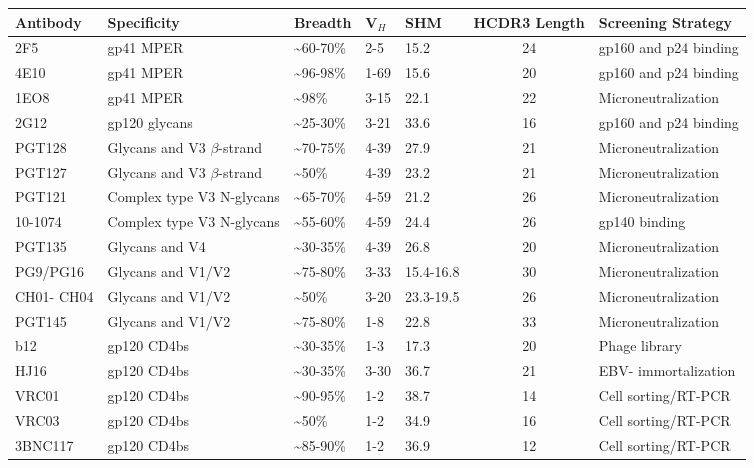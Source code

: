 \begin{sidewaystable}[htbp]
  \centering
\begin{tabular}{lllllcl}
\toprule
Antibody & Specificity & Breadth & V$_{H}$ & SHM & HCDR3 Length & Screening Strategy \\
\midrule
	2F5 & gp41 MPER & \textasciitilde60-70\% & 2-5 & 15.2 & 24 & gp160 and p24 binding \\
	4E10 & gp41 MPER & \textasciitilde96-98\% & 1-69 & 15.6 & 20 & gp160 and p24 binding   \\
	1EO8 & gp41 MPER & \textasciitilde98\% & 3-15 & 22.1 & 22 & Microneutralization  \\
	2G12 & gp120 glycans & \textasciitilde25-30\% & 3-21 & 33.6 & 16 & gp160 and p24 binding   \\
	PGT128 & Glycans and V3 $\beta$-strand & \textasciitilde70-75\% & 4-39 & 27.9 & 21 & Microneutralization  \\
	PGT127 & Glycans and V3 $\beta$-strand & \textasciitilde50\% & 4-39 & 23.2 & 21 & Microneutralization   \\
	PGT121 & Complex type V3 N-glycans & \textasciitilde65-70\% & 4-59 & 21.2 & 26 & Microneutralization  \\
	10-1074 & Complex type V3 N-glycans & \textasciitilde55-60\% & 4-59 & 24.4 & 26 & gp140 binding   \\
	PGT135 & Glycans and V4 & \textasciitilde30-35\% & 4-39 & 26.8 & 20 & Microneutralization   \\
	PG9/PG16 & Glycans and V1/V2 & \textasciitilde75-80\% & 3-33 & 15.4-16.8 & 30 & Microneutralization   \\
	CH01- CH04 & Glycans and V1/V2 & \textasciitilde50\% & 3-20 & 23.3-19.5 & 26 & Microneutralization  \\
	PGT145 & Glycans and V1/V2 & \textasciitilde75-80\% & 1-8 & 22.8 & 33 & Microneutralization \\
	b12 & gp120 CD4bs & \textasciitilde30-35\% & 1-3 & 17.3 & 20 & Phage library  \\
	HJ16 & gp120 CD4bs & \textasciitilde30-35\% & 3-30 & 36.7 & 21 & EBV- immortalization  \\
	VRC01 & gp120 CD4bs & \textasciitilde90-95\% & 1-2 & 38.7 & 14 & Cell sorting/RT-PCR \\
	VRC03 & gp120 CD4bs & \textasciitilde50\% & 1-2 & 34.9 & 16 & Cell sorting/RT-PCR \\
	3BNC117 & gp120 CD4bs & \textasciitilde85-90\% & 1-2 & 36.9 & 12 & Cell sorting/RT-PCR  \\

\end{tabular}
\end{sidewaystable}
